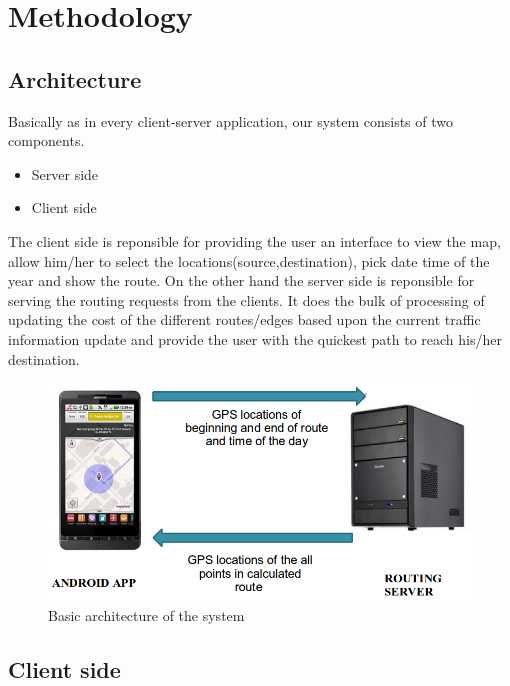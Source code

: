 \documentclass[a4paper,12pt, notitlepage, oneside, onecolumn]{article}
\begin{document}
\section{Methodology}

\subsection{Architecture}

Basically as in every client-server application, our system consists of two components.

\begin{itemize}
\item Server side
\item Client side
\end{itemize}

The client side is reponsible for providing the user an interface to view the map, allow him/her to select the locations(source,destination), pick date time of the year and show the route. On the other hand the server side is reponsible for serving the routing requests from the clients. It does the bulk of processing of updating the cost of the different routes/edges based upon the current traffic information update and provide the user with the quickest path to reach his/her destination.

\begin{figure}[ht]
\begin{minipage}[b]{1.0\linewidth}
\centering
\includegraphics[scale=0.5]{architecture.png}
\caption{Basic architecture of the system}
\label{fig:architecture}
\end{minipage}
\centering
\end{figure}

\subsection{Client side}
\end{document}
